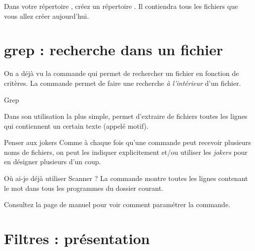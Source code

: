 \documentclass[a4paper,11pt]{style-esi/td}
\begin{document}
\entete
\titre
{}
\lastedit

\bigskip
\tableofcontents

\vfill
\begin{infobox}
    Dans votre répertoire , 
	créez un répertoire . 
    Il contiendra tous les fichiers que vous allez créer aujourd'hui. 
\end{infobox}
\vfill

\newpage

\section{grep : recherche dans un fichier}

	On a déjà vu la commande 
	qui permet de rechercher un fichier en fonction de critères.
	La commande  permet de faire une recherche 
	\emph{à l'intérieur} d'un fichier.

	\begin{theorie}{Grep}

		\medskip
		Dans son utilisation la plus simple, 
		permet d’extraire de fichiers 
		toutes les lignes qui contiennent un certain texte 
		(appelé motif).
	\end{theorie}

	\begin{infotbox}{Penser aux jokers}
		Comme à chaque fois qu'une commande peut recevoir plusieurs noms de fichiers,
		on peut les indiquer explicitement et/ou utiliser les \emph{jokers}
		pour en désigner plusieurs d'un coup.
	\end{infotbox}

	\begin{Exemple}{Où ai-je déjà utiliser Scanner ?}
		La commande  montre toutes les lignes
		contenant le mot 
		dans tous les programmes  du dossier courant.
	\end{Exemple}

	Consultez la page de manuel pour voir comment paramétrer la commande.

\section{Filtres : présentation}

\end{document}
